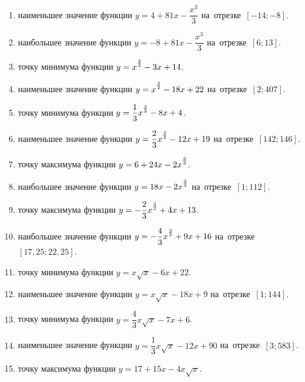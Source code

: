 \documentclass[a4paper,10pt]{article}
\begin{document}
\begin{enumerate}
\item {} наименьшее значение функции $y=4 +81x-\dfrac{x^3}{3}$ на~отрезке~$\left[-14;-8\right]$.

\item {} наибольшее значение функции $y=-8 +81x-\dfrac{x^3}{3}$ на~отрезке~$\left[6;13\right]$.

\item {} точку минимума функции $y=x\strut^{\frac{3}{2}} -3x+14$.

\item {} наименьшее значение функции $y=x\strut^{\frac{3}{2}} -18x+22$ на~отрезке~$\left[2;407\right]$.

\item {} точку минимума функции $y=\dfrac{1}{3}x\strut^{\frac{3}{2}} -8x+4$.

\item {} наименьшее значение функции $y=\dfrac{2}{3}x\strut^{\frac{3}{2}} -12x+19$ на~отрезке~$\left[142;146\right]$.

\item {} точку максимума функции $y=6+24x-2x\strut^{\frac{3}{2}}$.

\item {} наибольшее значение функции $y=18x-2x\strut^{\frac{3}{2}}$ на~отрезке~$\left[1;112\right]$.

\item {} точку максимума функции $y=-\dfrac{2}{3}x\strut^{\frac{3}{2}} +4x+13$.

\item {} наибольшее значение функции $y=-\dfrac{4}{3}x\strut^{\frac{3}{2}} +9x+16$ на~отрезке~$\left[17,25;22,25\right]$.

\item {} точку минимума функции $y=x\sqrt{x} -6x+22$.

\item {} наименьшее значение функции $y=x\sqrt{x} -18x+9$ на~отрезке~$\left[1;144\right]$.

\item {} точку минимума функции $y=\dfrac{4}{3}x\sqrt{x} -7x+6$.

\item {} наименьшее значение функции $y=\dfrac{1}{3}x\sqrt{x} -12x+90$ на~отрезке~$\left[3;583\right]$.

\item {} точку максимума функции $y=17+15x -4x\sqrt{x}$.


\end{enumerate}
\end{document}
